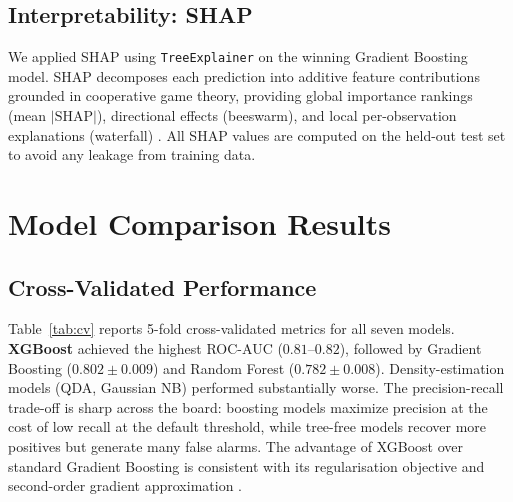 \documentclass[10pt,twocolumn]{article}
\begin{document}
\subsection{Interpretability: SHAP}

We applied SHAP \cite{lundberg2017, shannaq2025} using \texttt{TreeExplainer} on the winning Gradient Boosting model. SHAP decomposes each prediction into additive feature contributions grounded in cooperative game theory, providing global importance rankings (mean $|\text{SHAP}|$), directional effects (beeswarm), and local per-observation explanations (waterfall) \cite{raju2026}. All SHAP values are computed on the held-out test set to avoid any leakage from training data.

\section{Model Comparison Results}
\label{sec:results}

\subsection{Cross-Validated Performance}

Table~\ref{tab:cv} reports 5-fold cross-validated metrics for all seven models. \textbf{XGBoost} achieved the highest ROC-AUC ($0.81$--$0.82$), followed by Gradient Boosting ($0.802 \pm 0.009$) and Random Forest ($0.782 \pm 0.008$). Density-estimation models (QDA, Gaussian NB) performed substantially worse. The precision-recall trade-off is sharp across the board: boosting models maximize precision at the cost of low recall at the default threshold, while tree-free models recover more positives but generate many false alarms. The advantage of XGBoost over standard Gradient Boosting is consistent with its regularisation objective and second-order gradient approximation \cite{chen2016, karimabdallah2025}.
\end{document}
